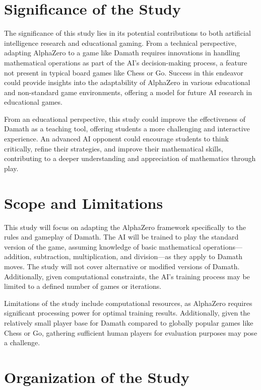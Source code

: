 \section{Significance of the Study}

The significance of this study lies in its potential contributions to both artificial intelligence research and educational gaming. From a technical perspective, adapting AlphaZero to a game like Damath requires innovations in handling mathematical operations as part of the AI’s decision-making process, a feature not present in typical board games like Chess or Go. Success in this endeavor could provide insights into the adaptability of AlphaZero in various educational and non-standard game environments, offering a model for future AI research in educational games.

From an educational perspective, this study could improve the effectiveness of Damath as a teaching tool, offering students a more challenging and interactive experience. An advanced AI opponent could encourage students to think critically, refine their strategies, and improve their mathematical skills, contributing to a deeper understanding and appreciation of mathematics through play.

\section{Scope and Limitations}

This study will focus on adapting the AlphaZero framework specifically to the rules and gameplay of Damath. The AI will be trained to play the standard version of the game, assuming knowledge of basic mathematical operations—addition, subtraction, multiplication, and division—as they apply to Damath moves. The study will not cover alternative or modified versions of Damath. Additionally, given computational constraints, the AI’s training process may be limited to a defined number of games or iterations.

Limitations of the study include computational resources, as AlphaZero requires significant processing power for optimal training results. Additionally, given the relatively small player base for Damath compared to globally popular games like Chess or Go, gathering sufficient human players for evaluation purposes may pose a challenge.

\section{Organization of the Study}

